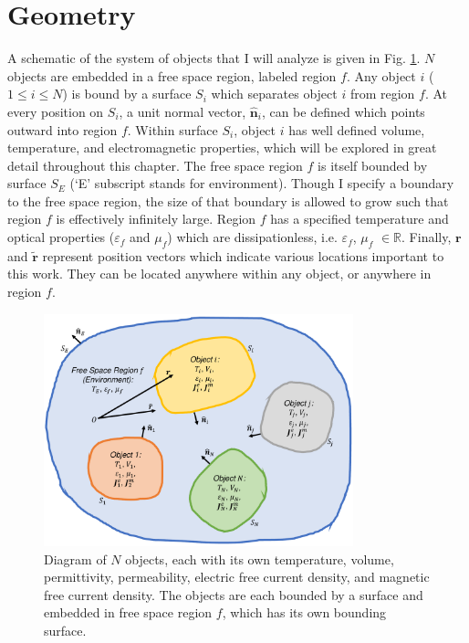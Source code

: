 \section{Geometry} \label{sec:Geometry}
%
A schematic of the system of objects that I will analyze is given in Fig. \ref{fig:DGF_Geometry}. $N$ objects are embedded in a free space region, labeled region $f$. Any object  $i$ ($1 \le i \le N$) is bound by a surface $S_{i}$ which separates object $i$ from region $f$. At every position on $S_{i}$, a unit normal vector, $\widehat{\boldsymbol{n}}_{i}$, can be defined which points outward into region $f$. Within surface $S_{i}$, object $i$ has well defined volume, temperature, and electromagnetic properties, which will be explored in great detail throughout this chapter. The free space region $f$ is itself bounded by surface $S_{E}$ (`E' subscript stands for environment). Though I specify a boundary to the free space region, the size of that boundary is allowed to grow such that region $f$ is effectively infinitely large. Region $f$ has a specified temperature and optical properties ($\varepsilon_{f}$ and $\mu_{f}$) which are dissipationless, i.e. $\varepsilon_{f}$, $\mu_{f}$ $\in \mathbb{R}$. Finally, $\boldsymbol{r}$ and $\widetilde{\boldsymbol{r}}$ represent position vectors which indicate various locations important to this work. They can be located anywhere within any object, or anywhere in region $f$.

\begin{figure}
\centering
\includegraphics[width=0.8\textwidth]{./Figures/DGF_Geometry.pdf}
\caption{\label{fig:DGF_Geometry}Diagram of $N$ objects, each with its own temperature, volume, permittivity, permeability, electric free current density, and magnetic free current density. The objects are each bounded by a surface and embedded in free space region $f$, which has its own bounding surface.}
\end{figure}


